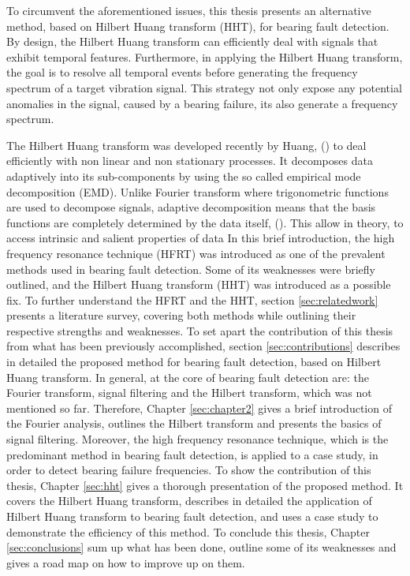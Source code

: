 \documentclass[../Main/thesis.tex]{subfiles}
\begin{document}
To circumvent the aforementioned issues, this thesis presents an alternative method, based on Hilbert Huang transform (HHT), for bearing fault detection. By design, the Hilbert Huang transform can efficiently deal with signals that exhibit temporal features. Furthermore, in applying the Hilbert Huang transform, the goal is to resolve all temporal events before generating the frequency spectrum of a target vibration signal. This strategy not only expose any potential anomalies in the signal, caused by a bearing failure, its also generate a   frequency spectrum.


\justify
The Hilbert Huang transform was developed recently by  Huang, (\cite{huang98}) to deal efficiently with non linear and non stationary processes. It decomposes data adaptively 
into its sub-components by using the so called empirical mode decomposition (EMD). Unlike Fourier transform where trigonometric functions are used to decompose signals, adaptive decomposition means that 
the basis functions are completely determined by the data itself, (\cite{huang08}). This allow in theory, to access intrinsic and salient properties of data
\justify
In this brief introduction, the high frequency resonance technique (HFRT) was introduced as one of the prevalent methods used in bearing fault detection. Some of its weaknesses were  briefly outlined, and the Hilbert Huang transform (HHT) was introduced as a possible fix. To further understand the HFRT and the HHT, section \ref{sec:relatedwork} presents a literature survey, covering both methods while outlining their respective strengths and weaknesses.
To set apart the contribution of this thesis from what has been previously accomplished, section \ref{sec:contributions} describes in detailed the proposed method for bearing fault detection, based on Hilbert Huang transform.
\justify
In general, at the core of bearing fault detection are: the Fourier transform, signal filtering and the Hilbert transform, which was not mentioned so far. Therefore,
 Chapter \ref{sec:chapter2} gives a brief introduction of the Fourier analysis, outlines the Hilbert transform and presents the basics of signal filtering. Moreover, the high frequency resonance technique, which is the predominant method in bearing fault detection, is applied to a case study, in order to detect bearing failure frequencies. To show the contribution of this thesis, Chapter \ref{sec:hht}
gives a thorough presentation of the proposed method. It covers the Hilbert Huang transform, describes in detailed the application of Hilbert Huang transform to bearing fault detection, and uses a case study to demonstrate the efficiency of this method. 
To conclude this thesis, Chapter \ref{sec:conclusions} sum up what has been done, outline some of its weaknesses and gives a road map on how to improve up on them.
\clearpage
\end{document}
